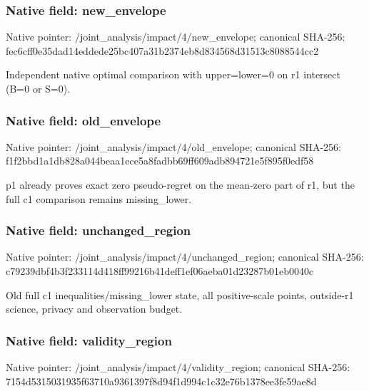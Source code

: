 \documentclass[10pt,a4paper]{article}
\begin{document}
\subsubsection{Native field: new\_\allowbreak{}envelope}
Native pointer: /joint\_\allowbreak{}analysis/impact/4/new\_\allowbreak{}envelope; canonical SHA-256: fec6cff0e35dad14eddede25bc407a31b2374eb8d834568d31513c8088544cc2

\begingroup\raggedright\sloppy Independent native optimal comparison with upper=\allowbreak{}lower=\allowbreak{}0 on r1 intersect (B=\allowbreak{}0 or S=\allowbreak{}0).\par\endgroup

\subsubsection{Native field: old\_\allowbreak{}envelope}
Native pointer: /joint\_\allowbreak{}analysis/impact/4/old\_\allowbreak{}envelope; canonical SHA-256: f1f2bbd1a1db828a044beaa1ece5a8fadbb69ff609adb894721e5f895f0edf58

\begingroup\raggedright\sloppy p1 already proves exact zero pseudo-regret on the mean-zero part of r1,\allowbreak{} but the full c1 comparison remains missing\_\allowbreak{}lower.\par\endgroup

\subsubsection{Native field: unchanged\_\allowbreak{}region}
Native pointer: /joint\_\allowbreak{}analysis/impact/4/unchanged\_\allowbreak{}region; canonical SHA-256: c79239dbf4b3f233114d418ff99216b41deff1ef06aeba01d23287b01eb0040c

\begingroup\raggedright\sloppy Old full c1 inequalities/\allowbreak{}missing\_\allowbreak{}lower state,\allowbreak{} all positive-scale points,\allowbreak{} outside-r1 science,\allowbreak{} privacy and observation budget.\par\endgroup

\subsubsection{Native field: validity\_\allowbreak{}region}
Native pointer: /joint\_\allowbreak{}analysis/impact/4/validity\_\allowbreak{}region; canonical SHA-256: 7154d5315031935f63710a9361397f8d94f1d994c1c32e76b1378ee3fe59ae8d
\end{document}
